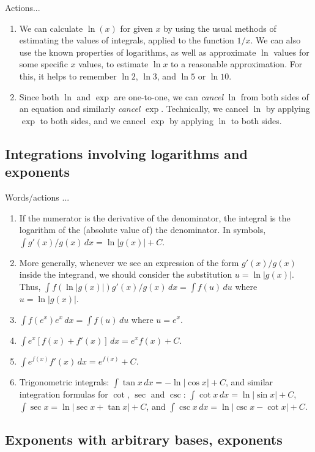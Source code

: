 \documentclass[10pt]{amsart}
\begin{document}
Actions...

\begin{enumerate}
\item We can calculate $\ln(x)$ for given $x$ by using the usual
  methods of estimating the values of integrals, applied to the
  function $1/x$. We can also use the known properties of logarithms,
  as well as approximate $\ln$ values for some specific $x$ values, to
  estimate $\ln x$ to a reasonable approximation. For this, it helps
  to remember $\ln 2$, $\ln 3$, and $\ln 5$ or $\ln 10$.
\item Since both $\ln$ and $\exp$ are one-to-one, we can {\em cancel}
  $\ln$ from both sides of an equation and similarly {\em cancel}
  $\exp$. Technically, we cancel $\ln$ by applying $\exp$ to both
  sides, and we cancel $\exp$ by applying $\ln$ to both sides.
\end{enumerate}

\subsection{Integrations involving logarithms and exponents}

Words/actions ...

\begin{enumerate}
\item If the numerator is the derivative of the denominator, the
  integral is the logarithm of the (absolute value of) the
  denominator. In symbols, $\int g'(x)/g(x) \, dx = \ln|g(x)| + C$.
\item More generally, whenever we see an expression of the form
  $g'(x)/g(x)$ inside the integrand, we should consider the
  substitution $u = \ln |g(x)|$. Thus, $\int f(\ln|g(x)|)g'(x)/g(x) \,
  dx = \int f(u) \, du$ where $u = \ln|g(x)|$.
\item $\int f(e^x) e^x \, dx = \int f(u) \, du$ where $u = e^x$.
\item $\int e^x[f(x) + f'(x)] \, dx = e^x f(x) + C$.
\item $\int e^{f(x)} f'(x) \, dx = e^{f(x)} + C$.
\item Trigonometric integrals: $\int \tan x \, dx = -\ln|\cos x| + C$,
  and similar integration formulas for $\cot$, $\sec$ and $\csc$:
  $\int \cot x \, dx = \ln|\sin x| + C$, $\int \sec x = \ln|\sec x +
  \tan x| + C$, and $\int \csc x \, dx = \ln |\csc x - \cot x| + C$.
\end{enumerate}

\subsection{Exponents with arbitrary bases, exponents}
\end{document}
